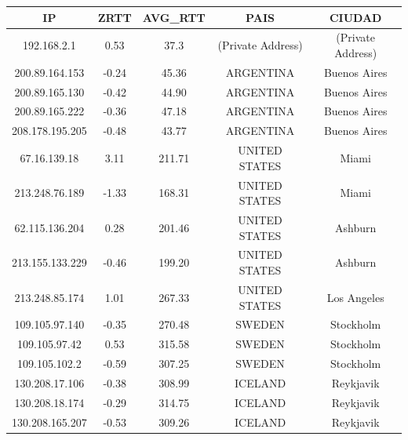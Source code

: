 \begin{tabular}{|c@{\hspace{5ex}}c@{\hspace{5ex}}c@{\hspace{5ex}}c@{\hspace{5ex}}c|}
\hline
\rule{0pt}{1.2em}IP & ZRTT & AVG\_RTT & PAIS & CIUDAD\\[0.2em]
\hline

\rule{0pt}{1.2em} 192.168.2.1  &  0.53 & 37.3 & (Private Address) & (Private Address) \\[0.2em]
\rule{0pt}{1.2em} 200.89.164.153  &  -0.24 & 45.36 & ARGENTINA & Buenos Aires \\[0.2em]
\rule{0pt}{1.2em} 200.89.165.130  &  -0.42 & 44.90 & ARGENTINA & Buenos Aires \\[0.2em]
\rule{0pt}{1.2em} 200.89.165.222  &  -0.36 & 47.18 & ARGENTINA & Buenos Aires \\[0.2em]
\rule{0pt}{1.2em} 208.178.195.205  &  -0.48 & 43.77 & ARGENTINA & Buenos Aires \\[0.2em]
\rule{0pt}{1.2em} 67.16.139.18  &  3.11 & 211.71 & UNITED STATES & Miami \\[0.2em]
\rule{0pt}{1.2em} 213.248.76.189  &  -1.33 & 168.31 & UNITED STATES & Miami \\[0.2em]
\rule{0pt}{1.2em} 62.115.136.204  &  0.28 & 201.46 & UNITED STATES & Ashburn \\[0.2em]
\rule{0pt}{1.2em} 213.155.133.229  &  -0.46 & 199.20 & UNITED STATES & Ashburn \\[0.2em]
\rule{0pt}{1.2em} 213.248.85.174  &  1.01 & 267.33 & UNITED STATES & Los Angeles \\[0.2em]
\rule{0pt}{1.2em} 109.105.97.140  &  -0.35 & 270.48 & SWEDEN & Stockholm \\[0.2em]
\rule{0pt}{1.2em} 109.105.97.42  &  0.53 & 315.58 & SWEDEN & Stockholm \\[0.2em]
\rule{0pt}{1.2em} 109.105.102.2  &  -0.59 & 307.25 & SWEDEN & Stockholm \\[0.2em]
\rule{0pt}{1.2em} 130.208.17.106  &  -0.38 & 308.99 & ICELAND & Reykjavik \\[0.2em]
\rule{0pt}{1.2em} 130.208.18.174  &  -0.29 & 314.75 & ICELAND & Reykjavik \\[0.2em]
\rule{0pt}{1.2em} 130.208.165.207  &  -0.53 & 309.26 & ICELAND & Reykjavik \\[0.2em]
\hline
\end{tabular}

~

